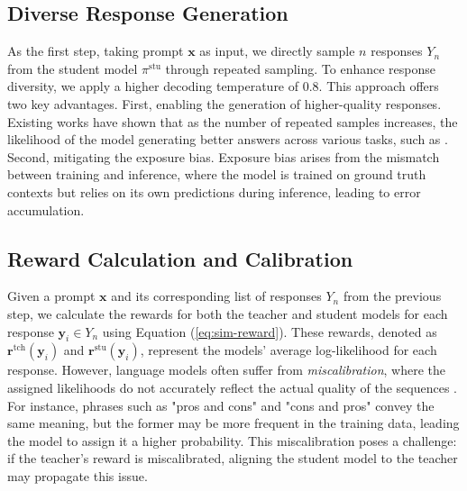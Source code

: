 \subsection{Diverse Response Generation}
\label{sec:phase-1}

As the first step, taking prompt $\boldsymbol{x}$ as input, we directly sample $n$ responses $Y_n$ from the student model $\pi^{\text{stu}}$ through repeated sampling. To enhance response diversity, we apply a higher decoding temperature of 0.8. This approach offers two key advantages. First, enabling the generation of higher-quality responses. Existing works have shown that as the number of repeated samples increases, the likelihood of the model generating better answers across various tasks, such as  \citep{wang-2023-selfconsistency, roz-2024-codellama, brown-2024-largelanguagemonkeysscaling}.  Second, mitigating the exposure bias. Exposure bias arises from the mismatch between training and inference, where the model is trained on ground truth contexts but relies on its own predictions during inference, leading to error accumulation. 

\subsection{Reward Calculation and Calibration}
\label{sec:phase-2}

Given a prompt $\boldsymbol{x}$ and its corresponding list of responses $Y_n$ from the previous step, we calculate the rewards for both the teacher and student models for each response $\boldsymbol{y}_i \in Y_n$ using Equation (\ref{eq:sim-reward}). These rewards, denoted as $\boldsymbol{r}^{\text{tch}}(\boldsymbol{y}_i)$ and $\boldsymbol{r}^{\text{stu}}(\boldsymbol{y}_i)$, represent the models' average log-likelihood for each response. However, language models often suffer from \textit{miscalibration}, where the assigned likelihoods do not accurately reflect the actual quality of the sequences \citep{zhao-2023-calibrating}. For instance, phrases such as "pros and cons" and "cons and pros" convey the same meaning, but the former may be more frequent in the training data, leading the model to assign it a higher probability. This miscalibration poses a challenge: if the teacher's reward is miscalibrated, aligning the student model to the teacher may propagate this issue.

